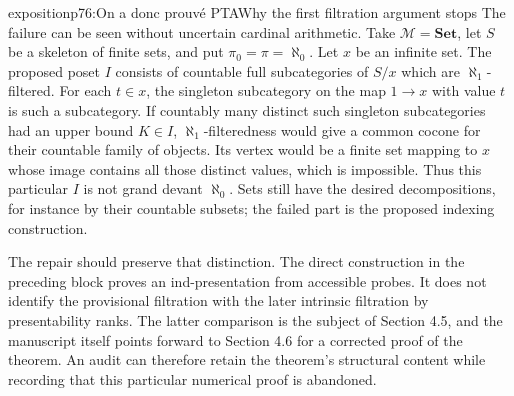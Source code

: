 \begin{dcomment}{exposition}{p76:On a donc prouvé PTA}{Why the first filtration argument stops}
The failure can be seen without uncertain cardinal arithmetic.  Take $\mathcal M=\mathbf{Set}$, let $S$ be a skeleton of finite sets, and put $\pi_0=\pi=\aleph_0$.  Let $x$ be an infinite set.  The proposed poset $I$ consists of countable full subcategories of $S/x$ which are $\aleph_1$-filtered.  For each $t\in x$, the singleton subcategory on the map $1\to x$ with value $t$ is such a subcategory.  If countably many distinct such singleton subcategories had an upper bound $K\in I$, $\aleph_1$-filteredness would give a common cocone for their countable family of objects.  Its vertex would be a finite set mapping to $x$ whose image contains all those distinct values, which is impossible.  Thus this particular $I$ is not grand devant $\aleph_0$.  Sets still have the desired decompositions, for instance by their countable subsets; the failed part is the proposed indexing construction.

The repair should preserve that distinction.  The direct construction in the preceding block proves an ind-presentation from accessible probes.  It does not identify the provisional filtration with the later intrinsic filtration by presentability ranks.  The latter comparison is the subject of Section 4.5, and the manuscript itself points forward to Section 4.6 for a corrected proof of the theorem.  An audit can therefore retain the theorem's structural content while recording that this particular numerical proof is abandoned.
\end{dcomment}

